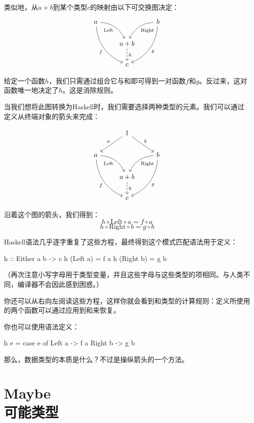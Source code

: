 \documentclass[DaoFP]{subfiles}
\begin{document}
 类似地，从$a + b$到某个类型$c$的映射由以下可交换图决定：
 \[
  \begin{tikzcd}
   a
   \arrow[dr,  bend left, "\text{Left}"']
   \arrow[ddr, bend right, "f"']
   && b
   \arrow[dl, bend right, "\text{Right}"]
   \arrow[ddl, bend left, "g"]
   \\
   &a + b
   \arrow[d, dashed, "h"]
   \\
   & c
  \end{tikzcd}
 \]

 给定一个函数$h$，我们只需通过组合它与和即可得到一对函数$f$和$g$。反过来，这对函数唯一地决定了$h$。这是消除规则。

 当我们想将此图转换为Haskell时，我们需要选择两种类型的元素。我们可以通过定义从终端对象的箭头来完成：

 \[
  \begin{tikzcd}
   &1
   \arrow[ld, "a"']
   \arrow[rd, "b"]
   \\
   a
   \arrow[dr,  bend left, "\text{Left}"']
   \arrow[ddr, bend right, "f"']
   && b
   \arrow[dl, bend right, "\text{Right}"]
   \arrow[ddl, bend left, "g"]
   \\
   &a + b
   \arrow[d, dashed, "h"]
   \\
   & c
  \end{tikzcd}
 \]

 沿着这个图的箭头，我们得到：
 \[h \circ \text{Left} \circ a = f \circ a\]
 \[h \circ \text{Right} \circ b = g \circ b\]

 Haskell语法几乎逐字重复了这些方程，最终得到这个模式匹配语法用于定义：

 \begin{haskell}
  h :: Either a b -> c
  h (Left  a) = f a
  h (Right b) = g b
 \end{haskell}
 （再次注意小写字母用于类型变量，并且这些字母与这些类型的项相同。与人类不同，编译器不会因此感到困惑。）

 你还可以从右向左阅读这些方程，这样你就会看到和类型的计算规则：定义所使用的两个函数可以通过应用到和来恢复。

 你也可以使用语法定义：
 \begin{haskell}
  h e = case e of
  Left  a -> f a
  Right b -> g b
 \end{haskell}

 那么，数据类型的本质是什么？不过是操纵箭头的一个方法。

 \section{Maybe\\可能类型}
\end{document}
